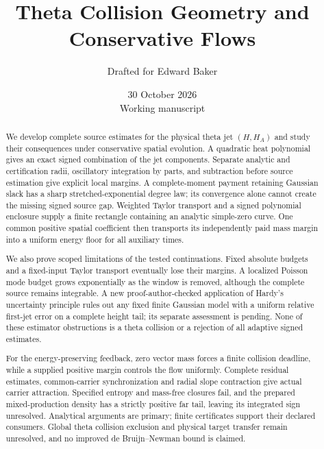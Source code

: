 \documentclass[11pt]{article}
\title{Theta Collision Geometry and Conservative Flows}
\author{Drafted for Edward Baker}
\date{30 October 2026\\[3pt]\small Working manuscript}
\numberwithin{equation}{section}
\begin{document}
\maketitle

\begin{abstract}
We develop complete source estimates for the physical theta jet
$(H,H_A)$ and study their consequences under conservative spatial
evolution. A quadratic heat polynomial gives an exact signed
combination of the jet components. Separate analytic and certification
radii, oscillatory integration by parts, and subtraction before source
estimation give explicit local margins. A complete-moment payment
retaining Gaussian slack has a sharp stretched-exponential degree law;
its convergence alone cannot create the missing signed source gap.
Weighted Taylor transport and a signed polynomial enclosure supply a
finite rectangle containing an analytic simple-zero curve. One common
positive spatial coefficient then transports its independently paid
mass margin into a uniform energy floor for all auxiliary times.

We also prove scoped limitations of the tested continuations. Fixed
absolute budgets and a fixed-input Taylor transport eventually lose
their margins. A localized Poisson mode budget grows exponentially
as the window is removed, although the complete source remains
integrable. A new proof-author-checked application of Hardy's
uncertainty principle rules out any fixed finite Gaussian model with
a uniform relative first-jet error on a complete height tail; its
separate assessment is pending. None of these estimator obstructions
is a theta collision or a rejection of all adaptive signed estimates.

For the energy-preserving feedback, zero vector mass forces a finite
collision deadline, while a supplied positive margin controls the
flow uniformly. Complete residual estimates, common-carrier
synchronization and radial slope contraction give actual carrier
attraction. Specified entropy and mass-free closures fail, and the
prepared mixed-production density has a strictly positive far tail,
leaving its integrated sign unresolved. Analytical arguments are
primary; finite certificates support their declared consumers.
Global theta collision exclusion and physical target transfer remain
unresolved, and no improved de Bruijn--Newman bound is claimed.
\end{abstract}

\setcounter{tocdepth}{1}
\tableofcontents
\clearpage
\end{document}
